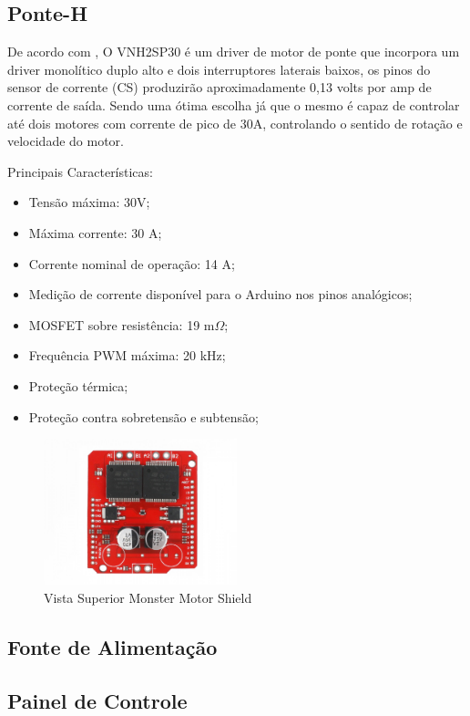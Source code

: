 \subsection{Ponte-H}
\label{sec:ponteh}

De acordo com \cite{monstermotorshield}, O VNH2SP30 é um driver de motor de ponte que incorpora um driver monolítico duplo alto e dois interruptores laterais baixos, os pinos do sensor de corrente (CS) produzirão aproximadamente 0,13 volts por amp de corrente de saída. Sendo uma ótima escolha já que o mesmo é capaz de controlar até dois motores com corrente de pico de 30A, controlando o sentido de rotação e velocidade do motor.

Principais Características:

\begin{itemize}
	\item Tensão máxima: 30V;
    \item Máxima corrente: 30 A;
    \item Corrente nominal de operação: 14 A;
    \item Medição de corrente disponível para o Arduino nos pinos analógicos;
    \item MOSFET sobre resistência: 19 m$\Omega$;
    \item Frequência PWM máxima: 20 kHz;
    \item Proteção térmica;
    \item Proteção contra sobretensão e subtensão;
\end{itemize}

\begin{figure}[!htb]
	\centering	
	\includegraphics[width=0.5\textwidth]{Figures/Rov/Monster_motor_shield.jpg}
	\caption{Vista Superior Monster Motor Shield \cite{monstermotorshield}}
	\label{fig:monstermotorshield}
\end{figure}

\subsection{Fonte de Alimentação}
\label{sec:fontedealimentacao}

\subsection{Painel de Controle}
\label{sec:paineldecontrole}
